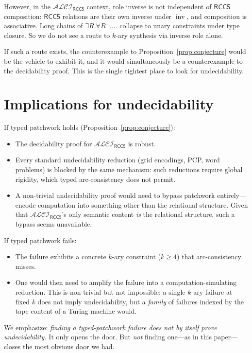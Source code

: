 \documentclass[11pt]{article}
\theoremstyle{definition}
\theoremstyle{remark}
\newcommand{\inv}{\operatorname{inv}}
\newcommand{\ALCIRCC}[1]{\mathcal{ALCI}_{\mathsf{RCC#1}}}
\begin{document}
However, in the $\ALCIRCC{5}$ context, role inverse is not
independent of $\mathsf{RCC5}$ composition: $\mathsf{RCC5}$
relations are their own inverse under $\inv$, and composition is
associative.  Long chains of $\exists R. \forall R^-. \ldots$
collapse to unary constraints under type closure.  So we do not
see a route to $k$-ary synthesis via inverse role alone.

If such a route exists, the counterexample to Proposition~\ref{prop:conjecture}
would be the vehicle to exhibit it, and it would simultaneously be
a counterexample to the decidability proof.  This is the single
tightest place to look for undecidability.

\section{Implications for undecidability}
\label{sec:undec}

If typed patchwork holds (Proposition~\ref{prop:conjecture}):
\begin{itemize}
  \item The decidability proof for $\ALCIRCC{5}$ is robust.
  \item Every standard undecidability reduction (grid encodings,
    PCP, word problems) is blocked by the same mechanism: such
    reductions require global rigidity, which typed arc-consistency
    does not permit.
  \item A non-trivial undecidability proof would need to bypass
    patchwork entirely---encode computation into something other
    than the relational structure.  Given that
    $\ALCIRCC{5}$'s only semantic content \emph{is} the
    relational structure, such a bypass seems unavailable.
\end{itemize}

If typed patchwork fails:
\begin{itemize}
  \item The failure exhibits a concrete $k$-ary constraint
    ($k \geq 4$) that arc-consistency misses.
  \item One would then need to amplify the failure into a
    computation-simulating reduction.  This is non-trivial but not
    impossible: a single $k$-ary failure at fixed $k$ does not
    imply undecidability, but a \emph{family} of failures indexed
    by the tape content of a Turing machine would.
\end{itemize}

We emphasize: \emph{finding a typed-patchwork failure does not by
itself prove undecidability.}  It only opens the door.  But
\emph{not} finding one---as in this paper---closes the most obvious
door we had.
\end{document}
